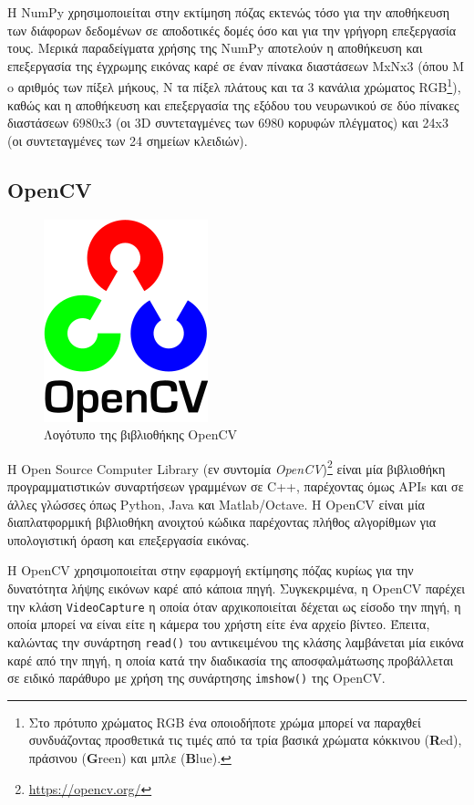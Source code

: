 Η NumPy χρησιμοποιείται στην εκτίμηση πόζας εκτενώς τόσο για την αποθήκευση των διάφορων δεδομένων σε αποδοτικές δομές όσο και για την γρήγορη επεξεργασία τους. Μερικά παραδείγματα χρήσης της NumPy αποτελούν η αποθήκευση και επεξεργασία της έγχρωμης εικόνας καρέ σε έναν πίνακα διαστάσεων ΜxΝx3 (όπου Μ o αριθμός των πίξελ μήκους, Ν τα πίξελ πλάτους και τα 3 κανάλια χρώματος RGB\footnote{Στο πρότυπο χρώματος RGB ένα οποιοδήποτε χρώμα μπορεί να παραχθεί συνδυάζοντας προσθετικά τις τιμές από τα τρία βασικά χρώματα κόκκινου (\textbf{R}ed), πράσινου (\textbf{G}reen) και μπλε (\textbf{B}lue).}), καθώς και η αποθήκευση και επεξεργασία της εξόδου του νευρωνικού σε δύο πίνακες διαστάσεων 6980x3 (οι 3D συντεταγμένες των 6980 κορυφών πλέγματος) και 24x3 (οι συντεταγμένες των 24 σημείων κλειδιών).


\subsection{OpenCV}
\label{sec:opencv}
\begin{figure}[h]
	\centering
	\includegraphics[scale=0.4]{images/chapter3/opencv_logo.png}
	\caption{Λογότυπο της βιβλιοθήκης OpenCV }
\end{figure}

Η Open Source Computer Library (εν συντομία \textsl{OpenCV})\footnote{\href{https://opencv.org/}{https://opencv.org/}} είναι μία βιβλιοθήκη προγραμματιστικών συναρτήσεων γραμμένων σε C++, παρέχοντας όμως APIs και σε άλλες γλώσσες όπως Python, Java και Matlab/Octave. Η OpenCV είναι μία διαπλατφορμική βιβλιοθήκη ανοιχτού κώδικα παρέχοντας πλήθος αλγορίθμων για υπολογιστική όραση και επεξεργασία εικόνας.

Η OpenCV χρησιμοποιείται στην εφαρμογή εκτίμησης πόζας κυρίως για την δυνατότητα λήψης εικόνων καρέ από κάποια πηγή. Συγκεκριμένα, η OpenCV παρέχει την κλάση \texttt{VideoCapture} η οποία όταν αρχικοποιείται δέχεται ως είσοδο την πηγή, η οποία μπορεί να είναι είτε η κάμερα του χρήστη είτε ένα αρχείο βίντεο. Έπειτα, καλώντας την συνάρτηση \texttt{read()} του αντικειμένου της κλάσης λαμβάνεται μία εικόνα καρέ από την πηγή, η οποία κατά την διαδικασία της αποσφαλμάτωσης προβάλλεται σε ειδικό παράθυρο με χρήση της συνάρτησης \texttt{imshow()} της OpenCV.

